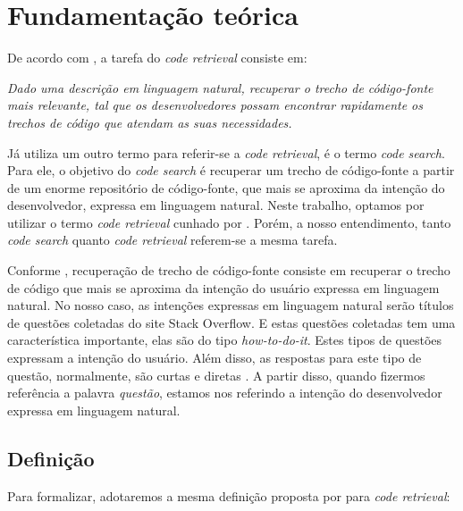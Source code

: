 \chapter{Fundamentação teórica}
\label{cap:fundamentacao-teorica}

De acordo com \cite{Chen-bi-variational-autoencoder:2018}, a tarefa do \textit{code retrieval} consiste em:

\emph{Dado uma descrição em linguagem natural, recuperar o trecho de código-fonte mais relevante, tal que os desenvolvedores possam encontrar rapidamente os trechos de código que atendam as suas necessidades.}

Já \cite{cambronero-deep-learning-code-search:2019} utiliza um outro termo para referir-se a \textit{code retrieval}, é o termo \textit{code search}. Para ele, o objetivo do \textit{code search} é recuperar um trecho de código-fonte a partir de um enorme repositório de código-fonte, que mais se aproxima da intenção do desenvolvedor, expressa em linguagem natural. Neste trabalho, optamos por utilizar o termo \textit{code retrieval} cunhado por \cite{Chen-bi-variational-autoencoder:2018}. Porém, a nosso entendimento, tanto \textit{code search} quanto \textit{code retrieval} referem-se a mesma tarefa.

Conforme \cite{cambronero-deep-learning-code-search:2019}, recuperação de trecho de código-fonte consiste em recuperar o trecho de código que mais se aproxima da intenção do usuário expressa em linguagem natural. No nosso caso, as intenções expressas em linguagem natural serão títulos de questões coletadas do site Stack Overflow. E estas questões coletadas tem uma característica importante, elas são do tipo \textit{how-to-do-it}. Estes tipos de questões expressam a intenção do usuário. Além disso, as respostas para este tipo de questão, normalmente, são curtas e diretas \citep{yao-2018}. A partir disso, quando fizermos referência a palavra \emph{questão}, estamos nos referindo a intenção do desenvolvedor expressa em linguagem natural.



\section{Definição}\label{sec:code-retrieval-definicao}


Para formalizar, adotaremos a mesma definição proposta por \cite{iyer-etal-2016-summarizing, Yao-coacor:2019} para \textit{code retrieval}:

